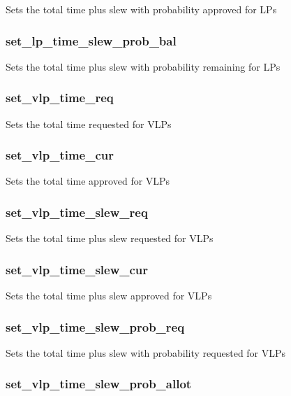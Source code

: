 \documentclass{article}
\begin{document}
Sets the total time plus slew with probability approved for LPs

\subsubsection*{set\_lp\_time\_slew\_prob\_bal\label{Panel_set_lp_time_slew_prob_bal}}


Sets the total time plus slew with probability remaining for LPs

\subsubsection*{set\_vlp\_time\_req\label{Panel_set_vlp_time_req}}


Sets the total time requested for VLPs

\subsubsection*{set\_vlp\_time\_cur\label{Panel_set_vlp_time_cur}}


Sets the total time approved for VLPs

\subsubsection*{set\_vlp\_time\_slew\_req\label{Panel_set_vlp_time_slew_req}}


Sets the total time plus slew requested for VLPs

\subsubsection*{set\_vlp\_time\_slew\_cur\label{Panel_set_vlp_time_slew_cur}}


Sets the total time plus slew approved for VLPs

\subsubsection*{set\_vlp\_time\_slew\_prob\_req\label{Panel_set_vlp_time_slew_prob_req}}


Sets the total time plus slew with probability requested for VLPs

\subsubsection*{set\_vlp\_time\_slew\_prob\_allot\label{Panel_set_vlp_time_slew_prob_allot}}
\end{document}
